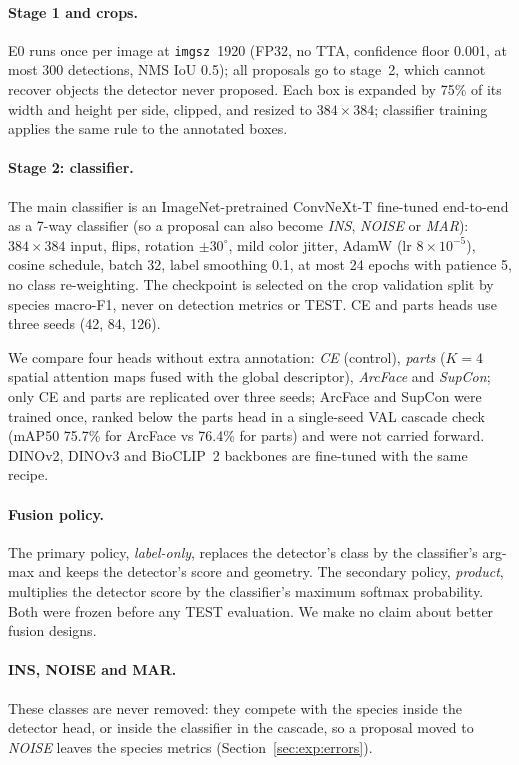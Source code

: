 \paragraph{Stage 1 and crops.}
E0 runs once per image at \texttt{imgsz}~1920 (FP32, no TTA, confidence floor 0.001, at most 300 detections, NMS IoU 0.5); all proposals go to stage~2, which cannot recover objects the detector never proposed. Each box is expanded by 75\% of its width and height per side, clipped, and resized to $384\times384$; classifier training applies the same rule to the annotated boxes.

\paragraph{Stage 2: classifier.}
The main classifier is an ImageNet-pretrained ConvNeXt-T fine-tuned end-to-end as a 7-way classifier (so a proposal can also become \emph{INS}, \emph{NOISE} or \emph{MAR}): $384\times384$ input, flips, rotation $\pm30^\circ$, mild color jitter, AdamW (lr $8\times10^{-5}$), cosine schedule, batch 32, label smoothing 0.1, at most 24 epochs with patience 5, no class re-weighting. The checkpoint is selected on the crop validation split by species macro-F1, never on detection metrics or TEST. CE and parts heads use three seeds (42, 84, 126).

We compare four heads without extra annotation: \emph{CE} (control), \emph{parts} ($K=4$ spatial attention maps fused with the global descriptor), \emph{ArcFace} and \emph{SupCon}; only CE and parts are replicated over three seeds; ArcFace and SupCon were trained once, ranked below the parts head in a single-seed VAL cascade check (mAP50 75.7\% for ArcFace vs 76.4\% for parts) and were not carried forward. DINOv2, DINOv3 and BioCLIP~2 backbones are fine-tuned with the same recipe.

\paragraph{Fusion policy.}
The primary policy, \emph{label-only}, replaces the detector's class by the classifier's arg-max and keeps the detector's score and geometry. The secondary policy, \emph{product}, multiplies the detector score by the classifier's maximum softmax probability. Both were frozen before any TEST evaluation. We make no claim about better fusion designs.

\paragraph{INS, NOISE and MAR.}
These classes are never removed: they compete with the species inside the detector head, or inside the classifier in the cascade, so a proposal moved to \emph{NOISE} leaves the species metrics (Section~\ref{sec:exp:errors}).

